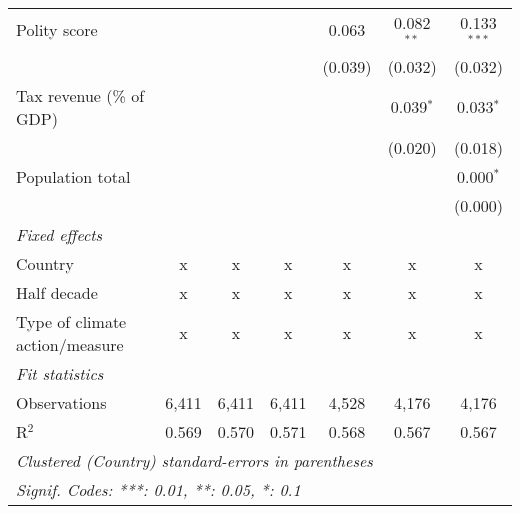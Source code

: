 \begin{tabular}{lcccccc}
   Polity score                                                     &         &                &                & 0.063          & 0.082$^{**}$   & 0.133$^{***}$\\   
                                                                    &         &                &                & (0.039)        & (0.032)        & (0.032)\\   
   Tax revenue (\% of GDP)                                          &         &                &                &                & 0.039$^{*}$    & 0.033$^{*}$\\   
                                                                    &         &                &                &                & (0.020)        & (0.018)\\   
   Population total                                                 &         &                &                &                &                & 0.000$^{*}$\\   
                                                                    &         &                &                &                &                & (0.000)\\   
   \emph{Fixed effects}\\
   Country                                                          & x       & x              & x              & x              & x              & x\\  
   Half decade                                                      & x       & x              & x              & x              & x              & x\\  
   Type of climate action/measure                                   & x       & x              & x              & x              & x              & x\\  
   \midrule \emph{Fit statistics}\\
   Observations                                                     & 6,411   & 6,411          & 6,411          & 4,528          & 4,176          & 4,176\\  
   R$^2$                                                            & 0.569   & 0.570          & 0.571          & 0.568          & 0.567          & 0.567\\  
   \midrule
   \multicolumn{7}{l}{\emph{Clustered (Country) standard-errors in parentheses}}\\
   \multicolumn{7}{l}{\emph{Signif. Codes: ***: 0.01, **: 0.05, *: 0.1}}\\
\end{tabular}
\par\endgroup



